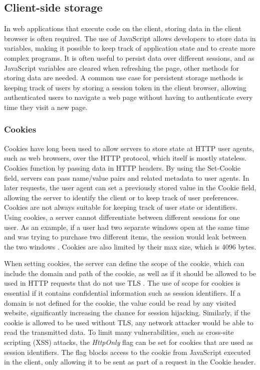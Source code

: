 \subsection{Client-side storage}
\label{sec:background-storage}

In web applications that execute code on the client, storing data in the client browser is often required.
The use of JavaScript allows developers to store data in variables, making it possible to keep track of application state and to create more complex programs.
It is often useful to persist data over different sessions, and as JavaScript variables are cleared when refreshing the page, other methods for storing data are needed.
A common use case for persistent storage methods is keeping track of users by storing a session token in the client browser, allowing authenticated users to navigate a web page without having to authenticate every time they visit a new page.

\subsubsection{Cookies}
\label{sec:background-storage-cookies}
Cookies have long been used to allow servers to store state at HTTP user agents, such as web browsers, over the HTTP protocol, which itself is mostly stateless.
Cookies function by passing data in HTTP headers.
By using the Set-Cookie field, servers can pass name/value pairs and related metadata to user agents.
In later requests, the user agent can set a previously stored value in the Cookie field, allowing the server to identify the client or to keep track of user preferences.
Cookies are not always suitable for keeping track of user state or identifiers.
Using cookies, a server cannot differentiate between different sessions for one user.
As an example, if a user had two separate windows open at the same time and was trying to purchase two different items, the session would leak between the two windows \citep{noauthor_html_nodate}.
Cookies are also limited by their max size, which is 4096 bytes.

When setting cookies, the server can define the scope of the cookie, which can include the domain and path of the cookie, as well as if it should be allowed to be used in HTTP requests that do not use TLS
\citep{barth_rfc6265_2011}.
The use of scope for cookies is essential if it contains confidential information such as session identifiers.
If a domain is not defined for the cookie, the value could be read by any visited website, significantly increasing the chance for session hijacking.
Similarly, if the cookie is allowed to be used without TLS, any network attacker would be able to read the transmitted data.
To limit many vulnerabilities, such as cross-site scripting (XSS) attacks, the \textit{HttpOnly} flag can be set for cookies that are used as session identifiers.
The flag blocks access to the cookie from JavaScript executed in the client, only allowing it to be sent as part of a request in the Cookie header.

